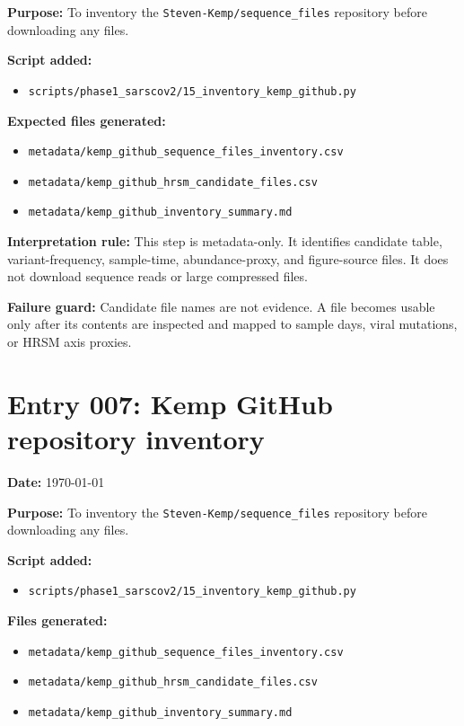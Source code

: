 \textbf{Purpose:} To inventory the \texttt{Steven-Kemp/sequence\_files} repository before downloading any files.

\textbf{Script added:}
\begin{itemize}
    \item \texttt{scripts/phase1\_sarscov2/15\_inventory\_kemp\_github.py}
\end{itemize}

\textbf{Expected files generated:}
\begin{itemize}
    \item \texttt{metadata/kemp\_github\_sequence\_files\_inventory.csv}
    \item \texttt{metadata/kemp\_github\_hrsm\_candidate\_files.csv}
    \item \texttt{metadata/kemp\_github\_inventory\_summary.md}
\end{itemize}

\textbf{Interpretation rule:} This step is metadata-only. It identifies candidate table, variant-frequency, sample-time, abundance-proxy, and figure-source files. It does not download sequence reads or large compressed files.

\textbf{Failure guard:} Candidate file names are not evidence. A file becomes usable only after its contents are inspected and mapped to sample days, viral mutations, or HRSM axis proxies.


\section*{Entry 007: Kemp GitHub repository inventory}

\textbf{Date:} \today

\textbf{Purpose:} To inventory the \texttt{Steven-Kemp/sequence\_files} repository before downloading any files.

\textbf{Script added:}
\begin{itemize}
    \item \texttt{scripts/phase1\_sarscov2/15\_inventory\_kemp\_github.py}
\end{itemize}

\textbf{Files generated:}
\begin{itemize}
    \item \texttt{metadata/kemp\_github\_sequence\_files\_inventory.csv}
    \item \texttt{metadata/kemp\_github\_hrsm\_candidate\_files.csv}
    \item \texttt{metadata/kemp\_github\_inventory\_summary.md}
\end{itemize}

